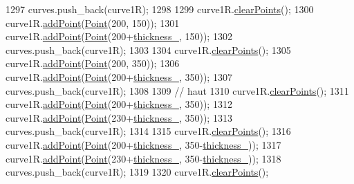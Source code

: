 \begin{DoxyCode}
1297     curves.push\_back(curve1R);
1298 
1299     curve1R.\mbox{\hyperlink{class_bezier_curve_a0ba8ce66d5af5971ae6a1b506029728e}{clearPoints}}();
1300     curve1R.\mbox{\hyperlink{class_bezier_curve_a38d16c18b36ae45619b05e26e226cf34}{addPoint}}(\mbox{\hyperlink{class_point}{Point}}(200, 150));
1301     curve1R.\mbox{\hyperlink{class_bezier_curve_a38d16c18b36ae45619b05e26e226cf34}{addPoint}}(\mbox{\hyperlink{class_point}{Point}}(200+\mbox{\hyperlink{class_font_v1_aed8040e76be9a52833627b92f0fb4e5f}{thickness\_}}, 150));
1302     curves.push\_back(curve1R);
1303 
1304     curve1R.\mbox{\hyperlink{class_bezier_curve_a0ba8ce66d5af5971ae6a1b506029728e}{clearPoints}}();
1305     curve1R.\mbox{\hyperlink{class_bezier_curve_a38d16c18b36ae45619b05e26e226cf34}{addPoint}}(\mbox{\hyperlink{class_point}{Point}}(200, 350));
1306     curve1R.\mbox{\hyperlink{class_bezier_curve_a38d16c18b36ae45619b05e26e226cf34}{addPoint}}(\mbox{\hyperlink{class_point}{Point}}(200+\mbox{\hyperlink{class_font_v1_aed8040e76be9a52833627b92f0fb4e5f}{thickness\_}}, 350));
1307     curves.push\_back(curve1R);
1308 
1309     \textcolor{comment}{// haut}
1310     curve1R.\mbox{\hyperlink{class_bezier_curve_a0ba8ce66d5af5971ae6a1b506029728e}{clearPoints}}();
1311     curve1R.\mbox{\hyperlink{class_bezier_curve_a38d16c18b36ae45619b05e26e226cf34}{addPoint}}(\mbox{\hyperlink{class_point}{Point}}(200+\mbox{\hyperlink{class_font_v1_aed8040e76be9a52833627b92f0fb4e5f}{thickness\_}}, 350));
1312     curve1R.\mbox{\hyperlink{class_bezier_curve_a38d16c18b36ae45619b05e26e226cf34}{addPoint}}(\mbox{\hyperlink{class_point}{Point}}(230+\mbox{\hyperlink{class_font_v1_aed8040e76be9a52833627b92f0fb4e5f}{thickness\_}}, 350));
1313     curves.push\_back(curve1R);
1314 
1315     curve1R.\mbox{\hyperlink{class_bezier_curve_a0ba8ce66d5af5971ae6a1b506029728e}{clearPoints}}();
1316     curve1R.\mbox{\hyperlink{class_bezier_curve_a38d16c18b36ae45619b05e26e226cf34}{addPoint}}(\mbox{\hyperlink{class_point}{Point}}(200+\mbox{\hyperlink{class_font_v1_aed8040e76be9a52833627b92f0fb4e5f}{thickness\_}}, 350-\mbox{\hyperlink{class_font_v1_aed8040e76be9a52833627b92f0fb4e5f}{thickness\_}}));
1317     curve1R.\mbox{\hyperlink{class_bezier_curve_a38d16c18b36ae45619b05e26e226cf34}{addPoint}}(\mbox{\hyperlink{class_point}{Point}}(230+\mbox{\hyperlink{class_font_v1_aed8040e76be9a52833627b92f0fb4e5f}{thickness\_}}, 350-\mbox{\hyperlink{class_font_v1_aed8040e76be9a52833627b92f0fb4e5f}{thickness\_}}));
1318     curves.push\_back(curve1R);
1319 
1320     curve1R.\mbox{\hyperlink{class_bezier_curve_a0ba8ce66d5af5971ae6a1b506029728e}{clearPoints}}();

\end{DoxyCode}
